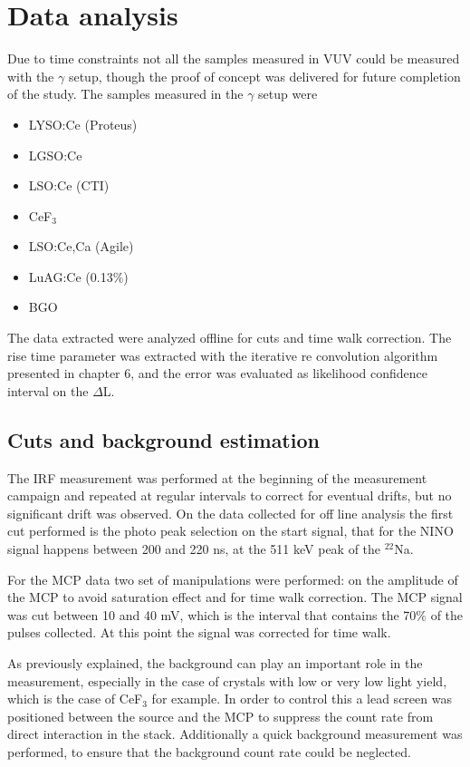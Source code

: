 \section{Data analysis}
Due to time constraints not all the samples measured in VUV could be measured with the $\gamma$ setup, though the proof of concept was delivered for future completion of the study.
The samples measured in the $\gamma$ setup were
\begin{itemize}
\item LYSO:Ce (Proteus)
\item LGSO:Ce
\item LSO:Ce (CTI)
\item CeF$_{3}$
\item LSO:Ce,Ca (Agile)
\item LuAG:Ce (0.13$\%$)
\item BGO
\end{itemize}
The data extracted were analyzed offline for cuts and time walk correction. 
The rise time parameter was extracted with the iterative re convolution algorithm presented in chapter 6, and the error was evaluated as likelihood confidence interval on the $\Delta$L.

\subsection{Cuts and background estimation}
The IRF measurement was performed at the beginning of the measurement campaign and repeated at regular intervals to correct for eventual drifts, but no significant drift was observed.
On the data collected for off line analysis the first cut performed is the photo peak selection on the start signal, that for the NINO signal happens between 200 and 220 ns, at the 511 keV peak of the $^{22}$Na.

For the MCP data two set of manipulations were performed: on the amplitude of the MCP to avoid saturation effect and for time walk correction. 
The MCP signal was cut between 10 and 40 mV, which is the interval that contains the 70$\%$ of the pulses collected. At this point the signal was corrected for time walk.

As previously explained, the background can play an important role in the measurement, especially in the case of crystals with low or very low light yield, which is the case of CeF$_{3}$ for example. 
In order to control this a lead screen was positioned between the source and the MCP to suppress the count rate from direct interaction in the stack. Additionally a quick background measurement was performed, to ensure that the background count rate could be neglected.

